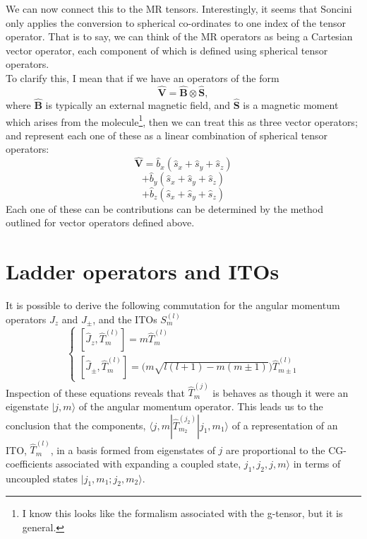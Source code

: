 \documentclass[12pt]{article}
\begin{document}
\noindent We can now connect this to the MR tensors. Interestingly,
it seems that Soncini only applies the conversion to spherical co-ordinates
to one index of the tensor operator. That is to say, we can think of the 
MR operators as being a Cartesian vector operator, 
each component of which is defined using spherical tensor operators.\\

\noindent To clarify this, I mean that if we have an operators of the form
\begin{equation}
\mathbf{\hat{V}} = \mathbf{\hat{B}}\otimes\mathbf{\hat{S}},
\end{equation}
where $\mathbf{\hat{B}}$ is typically an external
magnetic field, and $\mathbf{\hat{S}}$ is a magnetic moment
which arises from the molecule\footnote{I know
this looks like the formalism associated with the g-tensor, but
it is general.}, then we can treat this as three vector operators;
and represent each one of these as a linear combination of spherical tensor operators:
\begin{equation*}
\mathbf{\hat{V}} = \hat{b}_{x}(\hat{s}_{x}+\hat{s}_{y}+\hat{s}_{z})
\end{equation*}
\begin{equation*}
+                 \hat{b}_{y}(\hat{s}_{x}+\hat{s}_{y}+\hat{s}_{z})
\end{equation*}
\begin{equation}
+                 \hat{b}_{z}(\hat{s}_{x}+\hat{s}_{y}+\hat{s}_{z})
\end{equation}
\noindent 
\noindent Each one of these can be contributions can be determined by
the method outlined for vector operators defined above.\\

\section{Ladder operators and ITOs}
\noindent It is possible to derive the following commutation for the 
angular momentum operators $J_{z}$ and $J_{\pm}$, and the ITOs $S^{(l)}_{m}$\\
\begin{equation}
\begin{cases}
[\hat{J}_{z}, \hat{T}^{(l)}_{m} ]= m\hat{T}^{(l)}_{m}\\
[\hat{J}_{\pm}, \hat{T}^{(l)}_{m} ]= \Big(m\sqrt{l(l+1) - m(m\pm1)}\Big)\hat{T}^{(l)}_{m\pm1}
\end{cases}
\label{eqn:jtcommutation}
\end{equation}
\noindent Inspection of these equations reveals that $\hat{T}^{(j)}_{m}$ is 
behaves as though it were an eigenstate $|j,m\rangle$ of the angular momentum operator. This leads us to the conclusion that the components,
$\langle j,m| \hat{T}^{(j_{2})}_{m_{2}} | j_{1}, m_{1} \rangle$ of a representation
of an ITO, $\hat{T}^{(l)}_{m}$, in a basis  formed from eigenstates of $j$ are
proportional to the CG-coefficients associated with expanding a coupled
state, $j_{1}, j_{2}, j,m \rangle $ in terms of uncoupled states
 $|j_{1},m_{1};j_{2},m_{2} \rangle$.\\
\end{document}
